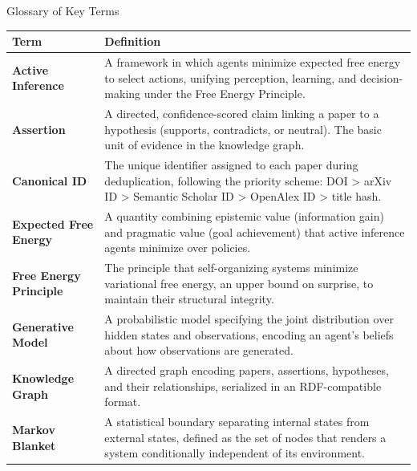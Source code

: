 \documentclass[
  ignorenonframetext,
]{beamer}
\newcounter{none} %
\begin{document}
\begin{frame}[fragile]{Glossary of Key Terms}
\protect{}\label{glossary-of-key-terms}
{\def\LTcaptype{none} %
\begin{longtable}[]{@{}
  >{\raggedright\arraybackslash}p{}
  >{\raggedright\arraybackslash}p{}@{}}
\toprule\noalign{}
\begin{minipage}[b]{\linewidth}\raggedright
Term
\end{minipage} & \begin{minipage}[b]{\linewidth}\raggedright
Definition
\end{minipage} \\
\midrule\noalign{}
\endhead
\textbf{Active Inference} & A framework in which agents minimize
expected free energy to select actions, unifying perception, learning,
and decision-making under the Free Energy Principle. \\
\textbf{Assertion} & A directed, confidence-scored claim linking a paper
to a hypothesis (supports, contradicts, or neutral). The basic unit of
evidence in the knowledge graph. \\
\textbf{Canonical ID} & The unique identifier assigned to each paper
during deduplication, following the priority scheme: DOI \textgreater{}
arXiv ID \textgreater{} Semantic Scholar ID \textgreater{} OpenAlex ID
\textgreater{} title hash. \\
\textbf{Expected Free Energy} & A quantity combining epistemic value
(information gain) and pragmatic value (goal achievement) that active
inference agents minimize over policies. \\
\textbf{Free Energy Principle} & The principle that self-organizing
systems minimize variational free energy, an upper bound on surprise, to
maintain their structural integrity. \\
\textbf{Generative Model} & A probabilistic model specifying the joint
distribution over hidden states and observations, encoding an agent's
beliefs about how observations are generated. \\
\textbf{Knowledge Graph} & A directed graph encoding papers, assertions,
hypotheses, and their relationships, serialized in an RDF-compatible
format. \\
\textbf{Markov Blanket} & A statistical boundary separating internal
states from external states, defined as the set of nodes that renders a
system conditionally independent of its environment. \\

\end{longtable}}
\end{frame}
\end{document}
